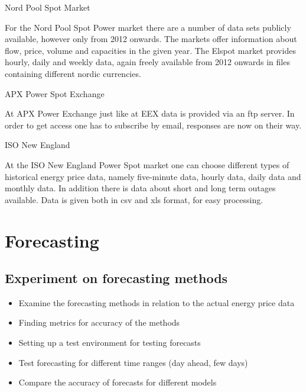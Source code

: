\documentclass[a4paper]{article}
\begin{document}
\begin{itemize}
	\subitem Nord Pool Spot Market
	
	For the Nord Pool Spot Power market there are a number of data sets publicly available, however only from 2012 onwards. 
	The markets offer information about flow, price, volume and capacities in the given year. The Elspot market provides hourly, daily and weekly data, again freely available from 2012 onwards in files containing different nordic currencies.  

	\subitem APX Power Spot Exchange
	
	At APX Power Exchange just like at EEX data is provided via an ftp server. In order to get access one has to subscribe by email, responses are now on their way. 
	
	\subitem ISO New England
	
	At the ISO New England Power Spot market one can choose different types of historical energy price data, namely five-minute data, hourly data, daily data and monthly data. In addition there is data about short and long term outages available. 
	Data is given both in csv and xls format, for easy processing. 

\end{itemize}



\vspace{1em}

\hfill\date{Week 16, from 14.04. to 20.04.}

\section{Forecasting}

\subsection{Experiment on forecasting methods}

\begin{itemize}

\item Examine the forecasting methods in relation to the actual energy price data

\item Finding metrics for accuracy of the methods

\item Setting up a test environment for testing forecasts

\item Test forecasting for different time ranges (day ahead, few days)

\item Compare the accuracy of forecasts for different models

\end{itemize}
\end{document}
